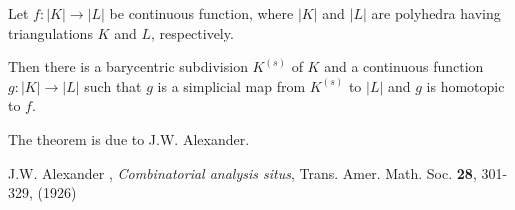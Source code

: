 \documentclass[12pt]{article}
\begin{document}
Let $f: |K| \to |L|$ be continuous function, where $|K|$ and $|L|$
are polyhedra having triangulations $K$ and $L$, respectively.

Then there is a barycentric subdivision $K^{(s)}$ of $K$ and a continuous
function $g:|K| \to |L|$ such that $g$ is a simplicial map from $K^{(s)}$
to $|L|$ and $g$ is homotopic to $f$.

The theorem is due to J.W. Alexander. 

\begin{thebibliography}{99}
 J.W. Alexander , \emph{Combinatorial analysis situs},
Trans. Amer. Math. Soc. \textbf{28}, 301-329, (1926)
\end{thebibliography} 

\end{document}
